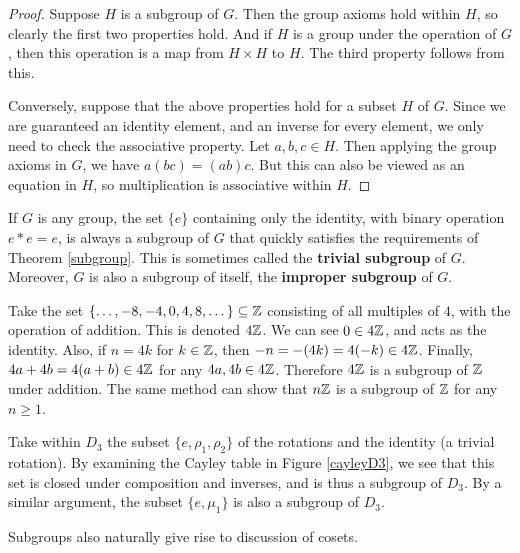 \begin{proof}
Suppose $H$ is a subgroup of $G$. Then the group axioms hold within $H$, so clearly the first two properties hold. And if $H$ is a group under the operation of $G$, then this operation is a map from $H \times H$ to $H$. The third property follows from this.

Conversely, suppose that the above properties hold for a subset $H$ of $G$. Since we are guaranteed an identity element, and an inverse for every element, we only need to check the associative property. Let $a, b, c \in H$. Then applying the group axioms in $G$, we have $a(bc) = (ab)c$. But this can also be viewed as an equation in $H$, so multiplication is associative within $H$.

\end{proof}

\begin{example}
If $G$ is any group, the set $\{e\}$ containing only the identity, with binary operation $e*e = e$, is always a subgroup of $G$ that quickly satisfies the requirements of Theorem \ref{subgroup}. This is sometimes called the \textbf{trivial subgroup} of $G$. Moreover, $G$ is also a subgroup of itself, the \textbf{improper subgroup} of $G$.
\end{example}

\begin{example}
\label{4z}
Take the set $\{\dots, -8, -4, 0, 4, 8, \dots\} \subseteq \mathbb{Z}$ consisting of all multiples of $4$, with the operation of addition. This is denoted $4\mathbb{Z}$. We can see $0 \in 4\mathbb{Z}$, and acts as the identity. Also, if $n = 4k$ for $k \in \mathbb{Z}$, then $-n = -(4k) = 4(-k) \in 4\mathbb{Z}$. Finally, $4a + 4b = 4(a+b) \in 4\mathbb{Z}$ for any $4a, 4b \in 4\mathbb{Z}$. Therefore $4\mathbb{Z}$ is a subgroup of $\mathbb{Z}$ under addition. The same method can show that $n\mathbb{Z}$ is a subgroup of $\mathbb{Z}$ for any $n \geq 1$.
\end{example}

\begin{example}
\label{d3_subgroups}
Take within $D_3$ the subset $\{e, \rho_1, \rho_2\}$ of the rotations and the identity (a trivial rotation). By examining the Cayley table in Figure \ref{cayleyD3}, we see that this set is closed under composition and inverses, and is thus a subgroup of $D_3$. By a similar argument, the subset $\{e, \mu_1\}$ is also a subgroup of $D_3$.
\end{example}

Subgroups also naturally give rise to discussion of cosets.

